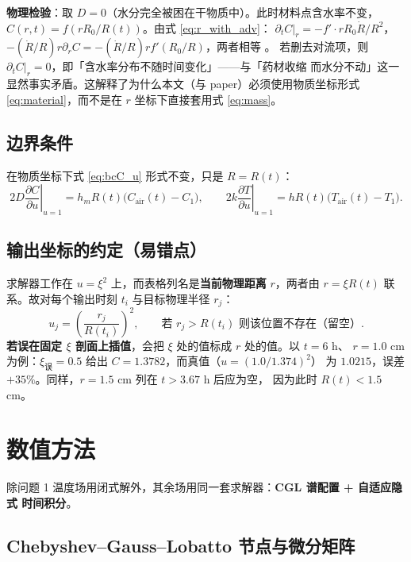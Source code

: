 \documentclass[11pt,a4paper]{article}
\theoremstyle{definition}
\begin{document}
\textbf{物理检验}：取 $D=0$（水分完全被困在干物质中）。此时材料点含水率不变，
$C(r,t)=f(rR_0/R(t))$。由式 \eqref{eq:r_with_adv}：
$\partial_tC|_r=-f'\cdot rR_0\dot R/R^2$，
$-(\dot R/R)r\partial_rC=-(\dot R/R)r f'(R_0/R)$，两者相等 \checkmark。
若删去对流项，则 $\partial_tC|_r=0$，即「含水率分布不随时间变化」——与「药材收缩
而水分不动」这一显然事实矛盾。这解释了为什么本文（与 paper）必须使用物质坐标形式
\eqref{eq:material}，而不是在 $r$ 坐标下直接套用式 \eqref{eq:mass}。

\subsection{边界条件}

在物质坐标下式 \eqref{eq:bcC_u} 形式不变，只是 $R=R(t)$：
\begin{equation}
2D\left.\frac{\partial C}{\partial u}\right|_{u=1}=h_mR(t)\big(C_{\mathrm{air}}(t)-C_1\big),
\qquad
2k\left.\frac{\partial T}{\partial u}\right|_{u=1}=hR(t)\big(T_{\mathrm{air}}(t)-T_1\big).
\end{equation}

\subsection{输出坐标的约定（易错点）}

求解器工作在 $u=\xi^2$ 上，而表格列名是\textbf{当前物理距离} $r$，两者由 $r=\xi R(t)$
联系。故对每个输出时刻 $t_i$ 与目标物理半径 $r_j$：
\[
u_j=\left(\frac{r_j}{R(t_i)}\right)^2,
\qquad
\text{若 } r_j>R(t_i) \text{ 则该位置不存在（留空）}.
\]
\textbf{若误在固定 $\xi$ 剖面上插值}，会把 $\xi$ 处的值标成 $r$ 处的值。以 $t=6$ h、
$r=1.0$ cm 为例：$\xi_{\text{误}}=0.5$ 给出 $C=1.3782$，而真值（$u=(1.0/1.374)^2$）
为 $1.0215$，误差 $+35\%$。同样，$r=1.5$ cm 列在 $t>3.67$ h 后应为空，
因为此时 $R(t)<1.5$ cm。

\section{数值方法}

除问题 1 温度场用闭式解外，其余场用同一套求解器：\textbf{CGL 谱配置 + 自适应隐式
时间积分}。

\subsection{Chebyshev--Gauss--Lobatto 节点与微分矩阵}
\end{document}
